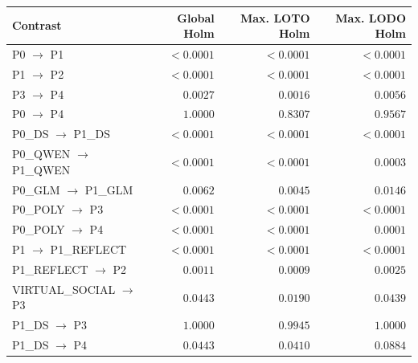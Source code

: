 \begin{tabular}{@{}lrrr@{}}\toprule
Contrast & Global Holm & Max. LOTO Holm & Max. LODO Holm\\\midrule
P0 $\to$ P1 & $<0.0001$ & $<0.0001$ & $<0.0001$\\
P1 $\to$ P2 & $<0.0001$ & $<0.0001$ & $<0.0001$\\
P3 $\to$ P4 & $0.0027$ & $0.0016$ & $0.0056$\\
P0 $\to$ P4 & $1.0000$ & $0.8307$ & $0.9567$\\
P0\_DS $\to$ P1\_DS & $<0.0001$ & $<0.0001$ & $<0.0001$\\
P0\_QWEN $\to$ P1\_QWEN & $<0.0001$ & $<0.0001$ & $0.0003$\\
P0\_GLM $\to$ P1\_GLM & $0.0062$ & $0.0045$ & $0.0146$\\
P0\_POLY $\to$ P3 & $<0.0001$ & $<0.0001$ & $<0.0001$\\
P0\_POLY $\to$ P4 & $<0.0001$ & $<0.0001$ & $0.0001$\\
P1 $\to$ P1\_REFLECT & $<0.0001$ & $<0.0001$ & $<0.0001$\\
P1\_REFLECT $\to$ P2 & $0.0011$ & $0.0009$ & $0.0025$\\
VIRTUAL\_SOCIAL $\to$ P3 & $0.0443$ & $0.0190$ & $0.0439$\\
P1\_DS $\to$ P3 & $1.0000$ & $0.9945$ & $1.0000$\\
P1\_DS $\to$ P4 & $0.0443$ & $0.0410$ & $0.0884$\\
\bottomrule\end{tabular}
